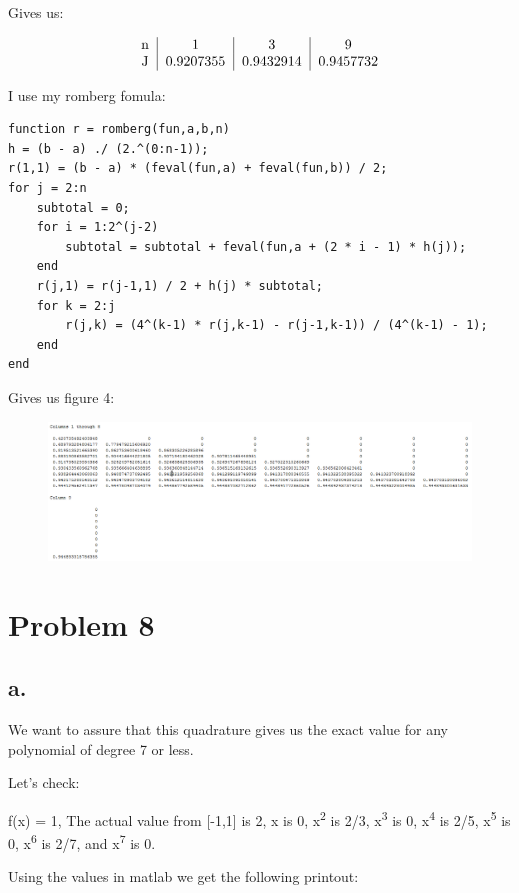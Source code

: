 \documentclass[]{article}
\begin{document}
Gives us:

\[
\begin{tabular}{c|c|c|c}
n & 1 & 3 & 9 \\
J & 0.9207355 & 0.9432914 & 0.9457732
\end{tabular}
\]

I use my romberg fomula:

\begin{verbatim}
function r = romberg(fun,a,b,n)
h = (b - a) ./ (2.^(0:n-1));
r(1,1) = (b - a) * (feval(fun,a) + feval(fun,b)) / 2;
for j = 2:n
    subtotal = 0;
    for i = 1:2^(j-2)
        subtotal = subtotal + feval(fun,a + (2 * i - 1) * h(j));
    end
    r(j,1) = r(j-1,1) / 2 + h(j) * subtotal;
    for k = 2:j
        r(j,k) = (4^(k-1) * r(j,k-1) - r(j-1,k-1)) / (4^(k-1) - 1);
    end
end
\end{verbatim}

Gives us figure 4:

\begin{figure}
\centering
\includegraphics{./ch4prob7.png}
\caption{}
\end{figure}

\section{Problem 8}\label{problem-8}

\subsection{a.}\label{a.}

We want to assure that this quadrature gives us the exact value for any
polynomial of degree 7 or less.

Let's check:

f(x) = 1, The actual value from {[}-1,1{]} is 2, x is 0,
x\textsuperscript{2} is 2/3, x\textsuperscript{3} is 0,
x\textsuperscript{4} is 2/5, x\textsuperscript{5} is 0,
x\textsuperscript{6} is 2/7, and x\textsuperscript{7} is 0.

Using the values in matlab we get the following printout:
\end{document}
